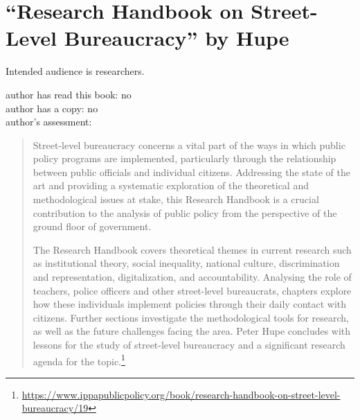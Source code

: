 \section{``Research Handbook on Street-Level Bureaucracy'' by Hupe\label{review:hupe_handbook}}
\cite{2019_Hupe}


Intended audience is researchers.

author has read this book: no\\
author has a copy: no\\
author's assessment:

\begin{quote}
Street-level bureaucracy concerns a vital part of the ways in which public policy programs are implemented, particularly through the relationship between public officials and individual citizens. Addressing the state of the art and providing a systematic exploration of the theoretical and methodological issues at stake, this Research Handbook is a crucial contribution to the analysis of public policy from the perspective of the ground floor of government. 

The Research Handbook covers theoretical themes in current research such as institutional theory, social inequality, national culture, discrimination and representation, digitalization, and accountability. Analysing the role of teachers, police officers and other street-level bureaucrats, chapters explore how these individuals implement policies through their daily contact with citizens. Further sections investigate the methodological tools for research, as well as the future challenges facing the area. Peter Hupe concludes with lessons for the study of street-level bureaucracy and a significant research agenda for the topic.\footnote{\href{https://www.ippapublicpolicy.org/book/research-handbook-on-street-level-bureaucracy/19}{https://www.ippapublicpolicy.org/book/research-handbook-on-street-level-bureaucracy/19}}
\end{quote}